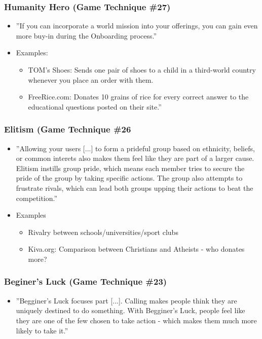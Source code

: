     \subsubsection{Humanity Hero (Game Technique \#27)}
    \begin{itemize}
        \item ''If you can incorporate a world mission into your offerings, you can gain even more buy-in during the Onboarding process.''
        \item Examples:
        \begin{itemize}
            \item TOM's Shoes: Sends one pair of shoes to a child in a third-world country whenever you place an order with them.
            \item FreeRice.com: Donates 10 grains of rice for every correct answer to the educational questions posted on their site.''
        \end{itemize}
    \end{itemize}
    
    \subsubsection{Elitism (Game Technique \#26}
    \begin{itemize}
        \item ''Allowing your users [...] to form a prideful group based on ethnicity, beliefs, or common interets also makes them feel like they are part of a larger cause. Elitism instills group pride, which means each member tries to secure the pride of the group by taking specific actions. The group also attempts to frustrate rivals, which can lead both groups upping their actions to beat the competition.''
        \item Examples
        \begin{itemize}
            \item Rivalry between schools/universities/sport clubs
            \item Kiva.org: Comparison between Christians and Atheists - who donates more?
        \end{itemize}
    \end{itemize}
    
    \subsubsection{Beginer's Luck (Game Technique \#23)}
    \begin{itemize}
        \item ''Begginer's Luck focuses part [...]. Calling makes people think they are uniquely destined to do something. With Begginer's Luck, people feel like they are one of the few chosen to take action - which makes them much more likely to take it.''
    \end{itemize}
    
